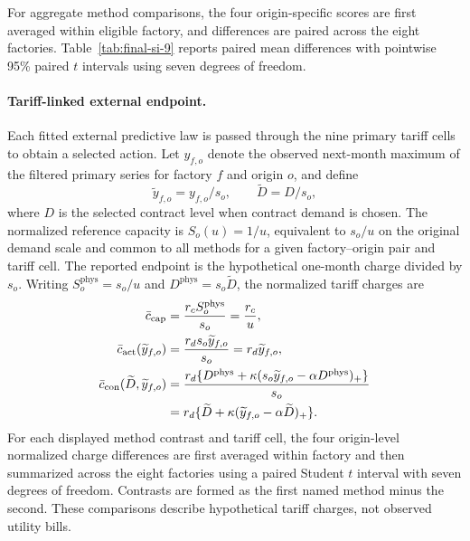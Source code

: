 \documentclass[]{interact}
\begin{document}
For aggregate method comparisons, the four origin-specific scores are
first averaged within eligible factory, and differences are paired
across the eight factories. Table~\ref{tab:final-si-9} reports paired
mean differences with pointwise 95\% paired $t$ intervals using seven
degrees of freedom.

\paragraph*{Tariff-linked external endpoint.}
Each fitted external predictive law is passed through the nine primary
tariff cells to obtain a selected action. Let $y_{f,o}$ denote the
observed next-month maximum of the filtered primary series for factory
$f$ and origin $o$, and define
\[
\widetilde y_{f,o}=y_{f,o}/s_o,
\qquad
\widetilde D=D/s_o,
\]
where $D$ is the selected contract level when contract demand is
chosen. The normalized reference capacity is $S_o(u)=1/u$, equivalent
to $s_o/u$ on the original demand scale and common to all methods for a
given factory--origin pair and tariff cell. The reported endpoint is
the hypothetical one-month charge divided by $s_o$. Writing
$S_o^{\mathrm{phys}}=s_o/u$ and $D^{\mathrm{phys}}=s_o\widetilde D$,
the normalized tariff charges are
\begin{align*}
\bar c_{\rm cap}
&=\frac{r_cS_o^{\mathrm{phys}}}{s_o}
=\frac{r_c}{u},\\
\bar c_{\rm act}(\widetilde y_{f,o})
&=\frac{r_ds_o\widetilde y_{f,o}}{s_o}
=r_d\widetilde y_{f,o},\\
\bar c_{\rm con}(\widetilde D,\widetilde y_{f,o})
&=\frac{r_d\{D^{\mathrm{phys}}
+\kappa(s_o\widetilde y_{f,o}-\alpha D^{\mathrm{phys}})_+\}}{s_o}\\
&=r_d\{\widetilde D
+\kappa(\widetilde y_{f,o}-\alpha\widetilde D)_+\}.
\end{align*}
For each displayed method contrast and tariff cell, the four
origin-level normalized charge differences are first averaged within
factory and then summarized across the eight factories using a paired
Student $t$ interval with seven degrees of freedom. Contrasts are
formed as the first named method minus the second. These comparisons
describe hypothetical tariff charges, not observed utility bills.





\end{document}
